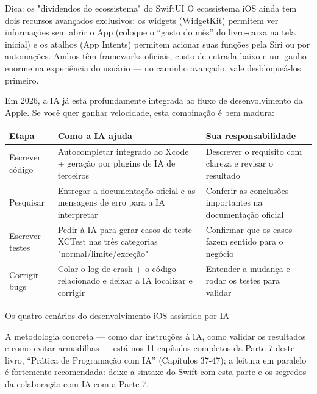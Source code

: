 \begin{tcbinfo}{Dica: os "dividendos do ecossistema" do SwiftUI}
O ecossistema iOS ainda tem dois recursos avançados exclusivos: os widgets (WidgetKit) permitem ver informações sem abrir o App (coloque o “gasto do mês” do livro-caixa na tela inicial) e os atalhos (App Intents) permitem acionar suas funções pela Siri ou por automações. Ambos têm frameworks oficiais, custo de entrada baixo e um ganho enorme na experiência do usuário — no caminho avançado, vale desbloqueá-los primeiro.

\end{tcbinfo}


Em 2026, a IA já está profundamente integrada ao fluxo de desenvolvimento da Apple. Se você quer ganhar velocidade, esta combinação é bem madura:

\begin{center}
\begin{tabularx}{\linewidth}{|X|X|X|}
\hline
\textbf{Etapa} & \textbf{Como a IA ajuda} & \textbf{Sua responsabilidade} \tabularnewline
\hline
Escrever código & Autocompletar integrado ao Xcode + geração por plugins de IA de terceiros & Descrever o requisito com clareza e revisar o resultado \tabularnewline
Pesquisar & Entregar a documentação oficial e as mensagens de erro para a IA interpretar & Conferir as conclusões importantes na documentação oficial \tabularnewline
Escrever testes & Pedir à IA para gerar casos de teste XCTest nas três categorias "normal/limite/exceção" & Confirmar que os casos fazem sentido para o negócio \tabularnewline
Corrigir bugs & Colar o log de crash + o código relacionado e deixar a IA localizar e corrigir & Entender a mudança e rodar os testes para validar \tabularnewline
\hline
\end{tabularx}
\end{center}

\begin{center}\small\color{gray}Os quatro cenários do desenvolvimento iOS assistido por IA\end{center}

A metodologia concreta — como dar instruções à IA, como validar os resultados e como evitar armadilhas — está nos 11 capítulos completos da Parte 7 deste livro, “Prática de Programação com IA” (Capítulos 37-47); a leitura em paralelo é fortemente recomendada: deixe a sintaxe do Swift com esta parte e os segredos da colaboração com IA com a Parte 7.

